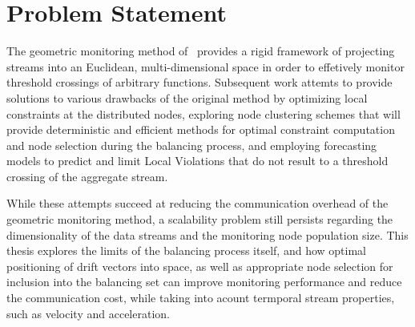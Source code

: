 \chapter{Problem Statement} \label{chap:probStatement}

The geometric monitoring method of~\cite{Sharfman2006GM} provides a rigid framework of projecting streams into an Euclidean, multi-dimensional space in order to effetively monitor threshold crossings of arbitrary functions. Subsequent work attemts to provide solutions to various drawbacks of the original method by optimizing local constraints at the distributed nodes, exploring node clustering schemes that will provide deterministic and efficient methods for optimal constraint computation and node selection during the balancing process, and employing forecasting models to predict and limit Local Violations that do not result to a threshold crossing of the aggregate stream.

While these attempts succeed at reducing the communication overhead of the geometric monitoring method, a scalability problem still persists regarding the dimensionality of the data streams and the monitoring node population size. This thesis explores the limits of the balancing process itself, and how optimal positioning of drift vectors into space, as well as appropriate node selection for inclusion into the balancing set can improve monitoring performance and reduce the communication cost, while taking into acount termporal stream properties, such as velocity and acceleration.
